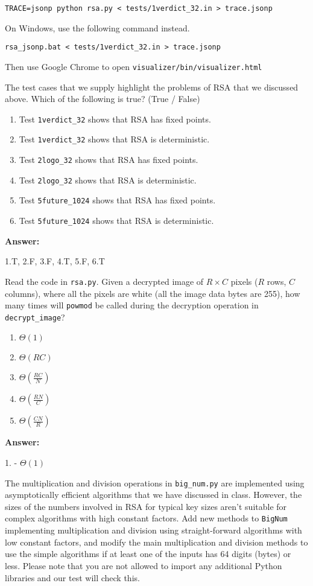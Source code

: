 \documentclass[12pt,twoside]{article}
\newcommand{\answer}{
 \par\medskip
 \textbf{Answer:}
}
\newcommand{\answerIIIe}{ \answer
1.T, 2.F, 3.F, 4.T, 5.F, 6.T
}
\newcommand{\answerIIIf}{ \answer
1. - $\Theta(1)$
}
\begin{document}
\begin{problems}
\texttt{TRACE=jsonp python rsa.py < tests/1verdict\_32.in > trace.jsonp}

On Windows, use the following command instead.

\texttt{rsa\_jsonp.bat < tests/1verdict\_32.in > trace.jsonp}

Then use Google Chrome to open
\texttt{visualizer/bin/visualizer.html}

\begin{problemparts}
\problempart {} The test cases that we supply highlight the problems of
RSA that we discussed above. Which of the following is true? (True / False)
\begin{enumerate}
  \item Test \texttt{1verdict\_32} shows that RSA has fixed points.
  \item Test \texttt{1verdict\_32} shows that RSA is deterministic.
  \item Test \texttt{2logo\_32} shows that RSA has fixed points.
  \item Test \texttt{2logo\_32} shows that RSA is deterministic.
  \item Test \texttt{5future\_1024} shows that RSA has fixed points.
  \item Test \texttt{5future\_1024} shows that RSA is deterministic.
\end{enumerate}
\answerIIIe

\problempart {} Read the code in \texttt{rsa.py}. Given a decrypted
image of $R \times C$ pixels ($R$ rows, $C$ columns), where all the pixels
are white (all the image data bytes are 255), how many times will
\texttt{powmod} be called during the decryption operation in
\texttt{decrypt\_image}?
\begin{enumerate}
  \item $\Theta(1)$
  \item $\Theta(R C)$
  \item $\Theta(\frac{RC}{N})$
  \item $\Theta(\frac{RN}{C})$
  \item $\Theta(\frac{CN}{R})$
\end{enumerate}
\answerIIIf

\problempart {} The multiplication and division operations in
\texttt{big\_num.py} are implemented using asymptotically efficient algorithms
that we have discussed in class. However, the sizes of the numbers involved in
RSA for typical key sizes aren't suitable for complex algorithms with high
constant factors. Add new methods to \texttt{BigNum} implementing multiplication
and division using straight-forward algorithms with low constant factors, and
modify the main multiplication and division methods to use the simple algorithms
if at least one of the inputs has 64 digits (bytes) or less. Please note that
you are not allowed to import any additional Python libraries and our test will
check this.
\end{problemparts}


\end{problems}
\end{document}
